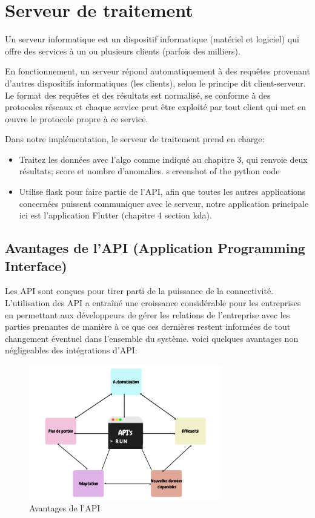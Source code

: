 \begin{itemize}
\end{itemize}

\newpage

\section{Serveur de traitement}
Un serveur informatique est un dispositif informatique (matériel et logiciel) qui offre des services à un ou plusieurs clients (parfois des milliers).


En fonctionnement, un serveur répond automatiquement à des requêtes provenant d'autres dispositifs informatiques (les clients), selon le principe dit client-serveur. Le format des requêtes et des résultats est normalisé, se conforme à des protocoles réseaux et chaque service peut être exploité par tout client qui met en œuvre le protocole propre à ce service.

Dans notre implémentation, le serveur de traitement prend en charge:
\renewcommand{\labelitemi}{$\bullet$}
\begin{itemize}
    \item Traitez les données avec l'algo comme indiqué au chapitre 3, qui renvoie deux résultats; score et nombre d'anomalies. \textcircled{screenshot of the python code}
    \item Utilise flask pour faire partie de l'API, afin que toutes les autres applications concernées puissent communiquer avec le serveur, notre application principale ici est l'application Flutter (chapitre 4 section kda).
\end{itemize}
\subsection{Avantages de l'API (Application Programming Interface)}
Les API sont conçues pour tirer parti de la puissance de la connectivité. L'utilisation des API a entraîné une croissance considérable pour les entreprises en permettant aux développeurs de gérer les relations de l'entreprise avec les parties prenantes de manière à ce que ces dernières restent informées de tout changement éventuel dans l'ensemble du système. voici quelques avantages non négligeables des intégrations d'API:

\begin{figure}[h!]
    \center
    \includegraphics[width=0.75\textwidth]{Images/chapter3/apiAvantages.png}
    \caption{Avantages de l'API}
  \end{figure}


